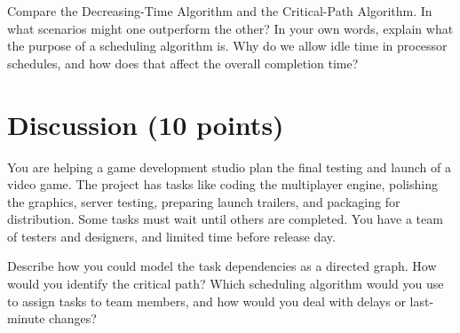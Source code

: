 \documentclass[12pt]{exam}
\begin{document}
\begin{questions}
\newpage
\question[4] Compare the Decreasing-Time Algorithm and the Critical-Path Algorithm. In what scenarios might one outperform the other?
\vspace{9cm}
\question[4] In your own words, explain what the purpose of a scheduling algorithm is. Why do we allow idle time in processor schedules, and how does that affect the overall completion time?

\vfill\newpage


\section*{Discussion (10 points)}

\question[10] You are helping a game development studio plan the final testing and launch of a video game. The project has tasks like coding the multiplayer engine, polishing the graphics, server testing, preparing launch trailers, and packaging for distribution. Some tasks must wait until others are completed. You have a team of testers and designers, and limited time before release day.

Describe how you could model the task dependencies as a directed graph. How would you identify the critical path? Which scheduling algorithm would you use to assign tasks to team members, and how would you deal with delays or last-minute changes?

\vspace{7cm}

\end{questions}
\end{document}
